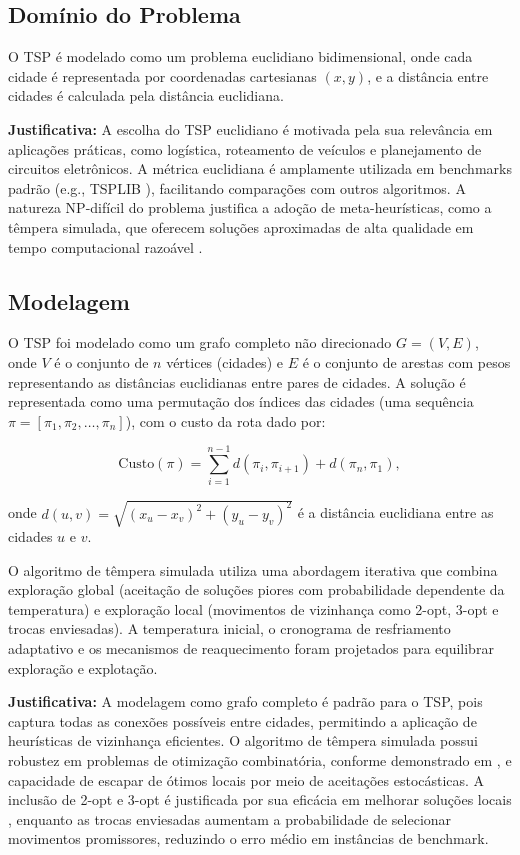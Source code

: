\documentclass[12pt]{article}
\begin{document}
\subsection{Domínio do Problema}
O TSP é modelado como um problema euclidiano bidimensional, onde cada cidade é representada por coordenadas cartesianas \((x, y)\), e a distância entre cidades é calculada pela distância euclidiana. 

\textbf{Justificativa:} A escolha do TSP euclidiano é motivada pela sua relevância em aplicações práticas, como logística, roteamento de veículos e planejamento de circuitos eletrônicos. A métrica euclidiana é amplamente utilizada em benchmarks padrão (e.g., TSPLIB \cite{reinelt1991tsplib}), facilitando comparações com outros algoritmos. A natureza NP-difícil do problema justifica a adoção de meta-heurísticas, como a têmpera simulada, que oferecem soluções aproximadas de alta qualidade em tempo computacional razoável \cite{kirkpatrick1983optimization}.

\subsection{Modelagem}
O TSP foi modelado como um grafo completo não direcionado \(G = (V, E)\), onde \(V\) é o conjunto de \(n\) vértices (cidades) e \(E\) é o conjunto de arestas com pesos representando as distâncias euclidianas entre pares de cidades. A solução é representada como uma permutação dos índices das cidades (uma sequência \(\pi = [\pi_1, \pi_2, \ldots, \pi_n]\)), com o custo da rota dado por:

\[
\text{Custo}(\pi) = \sum_{i=1}^{n-1} d\left(\pi_i, \pi_{i+1}\right) + d\left(\pi_n, \pi_1\right),
\]

onde \(d\left(u, v\right) = \sqrt{\left(x_u - x_v\right)^2 + \left(y_u - y_v\right)^2}\) é a distância euclidiana entre as cidades \(u\) e \(v\).

O algoritmo de têmpera simulada utiliza uma abordagem iterativa que combina exploração global (aceitação de soluções piores com probabilidade dependente da temperatura) e exploração local (movimentos de vizinhança como 2-opt, 3-opt e trocas enviesadas). A temperatura inicial, o cronograma de resfriamento adaptativo e os mecanismos de reaquecimento foram projetados para equilibrar exploração e explotação.

\textbf{Justificativa:} A modelagem como grafo completo é padrão para o TSP, pois captura todas as conexões possíveis entre cidades, permitindo a aplicação de heurísticas de vizinhança eficientes. O algoritmo de têmpera simulada possui robustez em problemas de otimização combinatória, conforme demonstrado em \cite{cerny1985thermodynamical}, e capacidade de escapar de ótimos locais por meio de aceitações estocásticas. A inclusão de 2-opt e 3-opt é justificada por sua eficácia em melhorar soluções locais \cite{lin1973effective}, enquanto as trocas enviesadas aumentam a probabilidade de selecionar movimentos promissores, reduzindo o erro médio em instâncias de benchmark.
\end{document}
